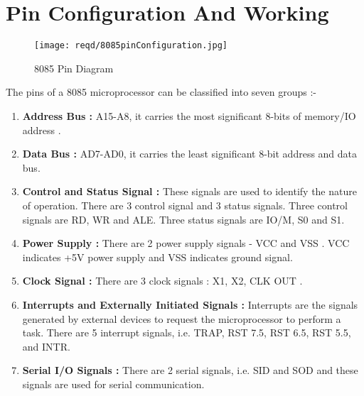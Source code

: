 \documentclass[14pt]{article}
\begin{document}
\section{Pin Configuration And Working}
\begin{figure}[h]
	\centering
	\texttt{[image: reqd/8085pinConfiguration.jpg]}
	\caption{8085 Pin Diagram}
\end{figure}
\vspace{1em}
The pins of a 8085 microprocessor can be classified into seven groups :-
\begin{enumerate}
	\item{\textbf{Address Bus :}} A15-A8, it carries the most significant 8-bits of memory/IO address .
	\item{\textbf{Data Bus :}} AD7-AD0, it carries the least significant 8-bit address and data bus.
	\item{\textbf{Control and Status Signal :}} These signals are used to identify the nature of operation. There are 3 control signal and 3 status signals. Three control signals are RD, WR and ALE. Three status signals are IO/M, S0 and S1.
	\item{\textbf{Power Supply : }} There are 2 power supply signals - VCC and VSS . VCC indicates +5V power supply and VSS indicates ground signal. 
	\item{\textbf{Clock Signal : }} There are 3 clock signals : X1, X2, CLK OUT .
	\item{\textbf{Interrupts and Externally Initiated Signals : }} Interrupts are the signals generated by external devices to request the microprocessor to perform a task. There are 5 interrupt signals, i.e. TRAP, RST 7.5, RST 6.5, RST 5.5, and INTR.
	\item{\textbf{Serial I/O Signals : }} There are 2 serial signals, i.e. SID and SOD and these signals are used for serial communication.
\end{enumerate}
\end{document}
